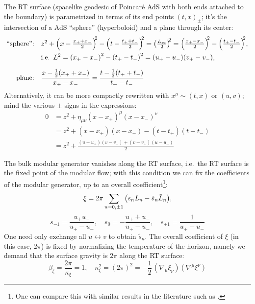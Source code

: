 \documentclass[11pt,a4paper]{article}
\begin{document}
	The RT surface (spacelike geodesic of Poincar\'e AdS with both ends attached to the boundary) is parametrized in terms of its end points $(t,x)_\pm$; it's the intersection of a AdS ``sphere'' (hyperboloid) and a plane through its center:
	\begin{equation}
	\begin{aligned}
	\text{``sphere'':} &&&\mathsmaller{
		z^2
		+ \pqty{x - \frac{x_+ + x_-}{2}}^{\!\!2}
		- \pqty{t - \frac{t_+ + t_-}{2}}^{\!\!2}
		= \pqty{\frac{L_\infty}{2}}^{\!\!2}
		= \pqty{\frac{x_+ - x_-}{2}}^{\!\!2}
		- \pqty{\frac{t_+ - t_-}{2}}^{\!\!2}
	},\\
	&&& \text{i.e.}\ \,
		L^2
		= \pqty{x_+ - x_-}^2
			- \pqty{t_+ - t_-}^2
		= (u_+ - u_-)(v_+ - v_-),
	\\[1.5ex]
	\text{plane:} &&&
		\frac{x - \frac{1}{2} (x_+ + x_-)}{x_+ - x_-}
		= \frac{t - \frac{1}{2} (t_+ + t_-)}{t_+ - t_-}
	\end{aligned}
	\end{equation}
	Alternatively, it can be more compactly rewritten with $x^\mu \sim (t,x)$ or $(u,v)$; mind the various $\pm$ signs in the expressions: 
	\begin{equation}
	\begin{aligned}
		0 &= z^2
			+ \eta_{\mu\nu} (x - x_+)^\mu (x - x_-)^\nu \\
		& = z^2
			+ (x - x_+)(x - x_-)
			- (t - t_+)(t - t_-) \\
		&= z^2 + \frac{
				(u - u_+)(v - v_-)
				+ (v - v_+)(u - u_-)
			}{2}
	\end{aligned}
	\end{equation}
	
	The bulk modular generator vanishes along the RT surface, i.e.~the RT surface is the fixed point of the modular flow; with this condition we can fix the coefficients of the modular generator, up to an overall coefficient\footnote{
		One can compare this with similar results in the literature such as \cite{Lashkari:2016idm,Czech:2019vih,Apolo:2020qjm}. 
	}:
	\begin{equation}
		\xi = 2\pi \sum_{n=0,\pm 1} \pqty{
				s_n L_n - \tilde{s}_n \tilde{L}_n
			},
	\end{equation}
	\begin{equation}
		s_{-1} = \frac{u_+ u_-}{u_+ - u_-},\quad
		s_0 = - \frac{u_+ + u_-}{u_+ - u_-},\quad
		s_{+1} = \frac{1}{u_+ - u_-}
	\end{equation}
	One need only exchange all $u\leftrightarrow v$ to obtain $\tilde{s}_n$. The overall coefficient of $\xi$ (in this case, $2\pi$) is fixed by normalizing the temperature of the horizon, namely we demand that the surface gravity is $2\pi$ along the RT surface:
	\begin{equation}
		\beta_\xi = \frac{2\pi}{\kappa_\xi} = 1,
	\quad
		\kappa_\xi^2
		= (2\pi)^2
		= -\frac{1}{2}\,
			(\nabla_{\mu} \xi_{\nu})
			(\nabla^{\mu} \xi^{\nu})
	\end{equation}
	
\end{document}
